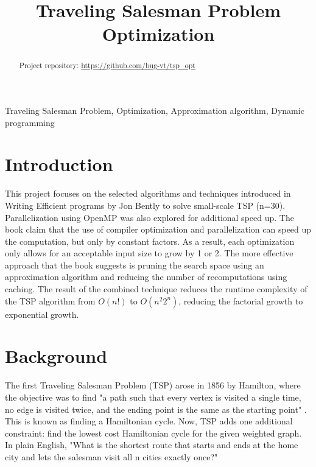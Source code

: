 \documentclass[conference]{IEEEtran}
\begin{document}
\title{Traveling Salesman Problem Optimization\\ }

\author{
}

\maketitle

\begin{abstract}
Project repository: \url{https://github.com/bug-vt/tsp_opt}
\end{abstract}

\begin{IEEEkeywords}
Traveling Salesman Problem, Optimization, Approximation algorithm, Dynamic programming
\end{IEEEkeywords}

\section{Introduction}
This project focuses on the selected algorithms and techniques introduced in Writing Efficient programs by Jon Bently \cite{b4} to solve small-scale TSP (n=30). Parallelization using OpenMP was also explored for additional speed up. The book claim that the use of compiler optimization and parallelization can speed up the computation, but only by constant factors. As a result, each optimization only allows for an acceptable input size to grow by 1 or 2. The more effective approach that the book suggests is pruning the search space using an approximation algorithm and reducing the number of recomputations using caching. The result of the combined technique reduces the runtime complexity of the TSP algorithm from $O(n!)$ to $O(n^2 2^n)$, reducing the factorial growth to exponential growth. 

\section{Background}
The first Traveling Salesman Problem (TSP) arose in 1856 by Hamilton, where the objective was to find "a path such that every vertex is visited a single time, no edge is visited twice, and the ending point is the same as the starting point" \cite{b1}. This is known as finding a Hamiltonian cycle. Now, TSP adds one additional constraint: find the lowest cost Hamiltonian cycle for the given weighted graph. In plain English, "What is the shortest route that starts and ends at the home city and lets the salesman visit all n cities exactly once?" 
\end{document}

